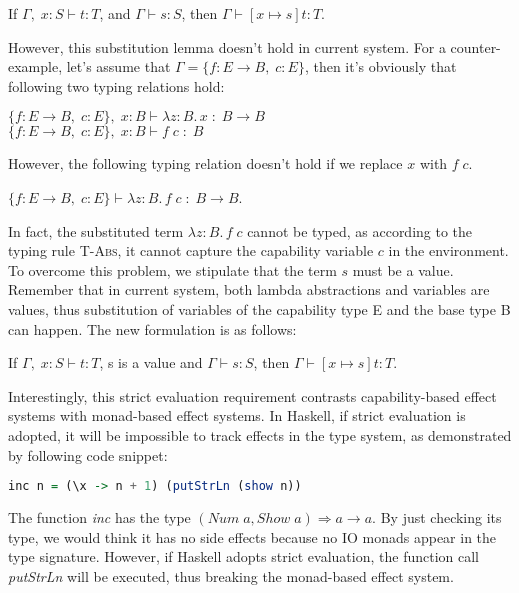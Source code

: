 \begin{lemma}
If $\Gamma,\; x:S \vdash t : T$, and $\Gamma \vdash s : S$, then $\Gamma
\vdash [x \mapsto s]t : T$.
\end{lemma}

However, this substitution lemma doesn't hold in current system. For a
counter-example, let's assume that $\Gamma = \{f: E \to B,\; c:E\}$,
then it's obviously that following two typing relations hold:

$\{f: E \to B,\; c:E\},\; x:B \vdash \lambda z:B.\,x \; : \; B \to
  B$ \\
$\{f: E \to B,\; c:E\},\; x:B \vdash f \; c \; : \; B$

However, the following typing relation doesn't hold if we replace $x$
with $f \; c$.

$\{f: E \to B,\; c:E\} \vdash \lambda z:B.\,f \; c \; : \; B \to B$.

In fact, the substituted term $\lambda z:B.\,f \; c$ cannot be typed,
as according to the typing rule \textsc{T-Abs}, it cannot capture the
capability variable $c$ in the environment. To overcome this problem,
we stipulate that the term $s$ must be a value. Remember that in
current system, both lambda abstractions and variables are values,
thus substitution of variables of the capability type E and the base
type B can happen. The new formulation is as follows:

\begin{lemma}
  If $\Gamma,\; x:S \vdash t : T$, s is a value and
  $\Gamma \vdash s : S$, then $\Gamma \vdash [x \mapsto s]t : T$.
\end{lemma}

Interestingly, this strict evaluation requirement contrasts
capability-based effect systems with monad-based effect systems. In
Haskell, if strict evaluation is adopted, it will be impossible to
track effects in the type system, as demonstrated by following code
snippet:

\begin{lstlisting}[language=Haskell]
  inc n = (\x -> n + 1) (putStrLn (show n))
\end{lstlisting}

The function \emph{inc} has the type
$(Num\;a, Show\;a) \Rightarrow a \to a$. By just checking its type, we
would think it has no side effects because no IO monads appear in the
type signature. However, if Haskell adopts strict evaluation, the
function call \emph{putStrLn} will be executed, thus breaking the
monad-based effect system.


